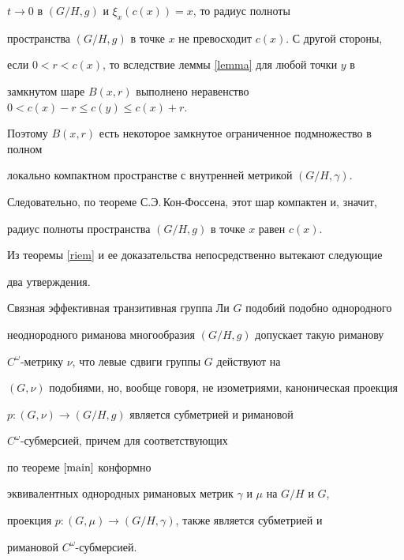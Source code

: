 \begin{pf}
$t\rightarrow 0$ в $(G/H,g)$ и $\xi_{x}(c(x))=x$, то радиус полноты


пространства $(G/H,g)$ в точке $x$ не превосходит $c(x)$. С другой стороны,


если $0<r<c(x)$, то вследствие леммы \ref{lemma} для любой точки $y$ в


замкнутом шаре $B(x,r)$ выполнено неравенство $0<c(x)-r\leq c(y)\leq c(x)+r$.


Поэтому $B(x,r)$ есть некоторое замкнутое ограниченное подмножество в полном


локально компактном пространстве с внутренней метрикой $(G/H,\gamma)$.


Следовательно, по теореме С.Э.\,Кон-Фоссена, этот шар компактен и, значит,


радиус полноты пространства $(G/H,g)$ в точке $x$ равен $c(x)$.


\end{pf}





Из теоремы \ref{riem} и ее доказательства непосредственно вытекают следующие


два утверждения.





\begin{props}


Связная эффективная транзитивная группа Ли $G$ подобий подобно однородного


неоднородного риманова многообразия $(G/H,g)$ допускает такую риманову


$C^{\omega}$-мет\-рику $\nu$, что левые сдвиги группы $G$ действуют на


$(G,\nu)$ подобиями, но, вообще говоря, не изометриями, каноническая проекция


$p:(G,\nu)\rightarrow (G/H,g)$ является субметрией и римановой


$C^{\omega}$-субмерсией, причем для соответствующих


по теореме $\ref{main}$ конформно


эквивалентных однородных римановых метрик $\gamma$ и $\mu$ на $G/H$ и $G$,


проекция $p:(G,\mu)\rightarrow (G/H,\gamma)$, также является субметрией и


римановой $C^{\omega}$-субмерсией.


\end{props}





